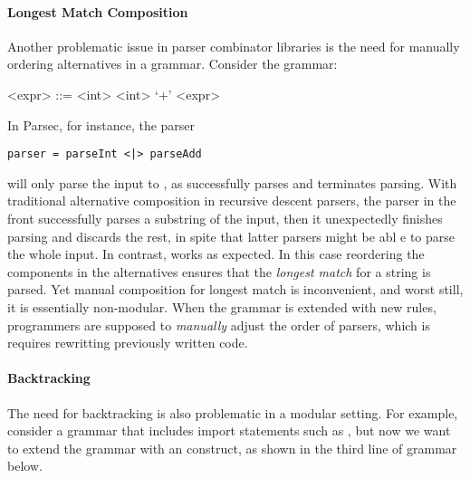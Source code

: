 \paragraph{Longest Match Composition} Another problematic issue 
in parser combinator libraries is the need for manually ordering 
alternatives in a grammar.
Consider the grammar:
\setlength{\grammarindent}{5em}
\begin{grammar}
<expr> ::= <int> \alt <int> `+' <expr>
\end{grammar}
In Parsec, for instance, the parser
\begin{lstlisting}[language=PlainCode]
parser = parseInt <|> parseAdd
\end{lstlisting}
will only parse the input  to , as  successfully parses 
and terminates parsing. With traditional alternative
composition in recursive descent parsers, the parser in the front successfully parses a substring of the input, then it unexpectedly
finishes parsing and discards the rest, in spite that latter parsers might be abl e to parse the whole input.
In contrast,  works as expected. 
In this case reordering the components in the alternatives ensures that 
the \emph{longest match} for a string is parsed. Yet manual composition for longest match is inconvenient, and worst still, it is essentially non-modular. When the grammar is extended with new rules, programmers are supposed to \emph{manually} adjust
the order of parsers, which is requires rewritting previously written code.

\paragraph{Backtracking} The need for backtracking is also problematic
in a modular setting. For example, consider a grammar that includes 
import statements such as ,
but now we want to extend the grammar with an  construct, as shown in the third line of grammar below.

